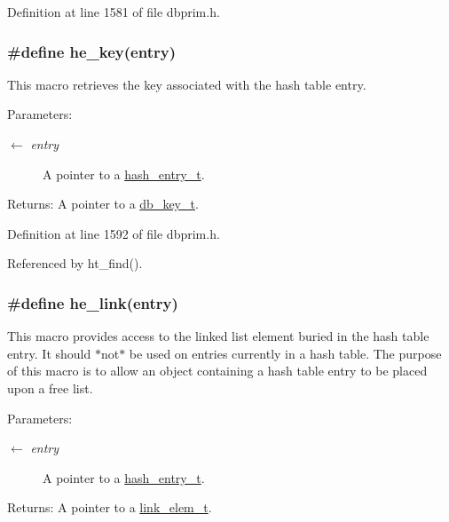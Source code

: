 Definition at line 1581 of file dbprim.h.\hypertarget{group__dbprim__hash_ga44}{
\subsubsection[he\_\-key]{\setlength{\rightskip}{0pt plus 5cm}\#define he\_\-key(entry)}}
\label{group__dbprim__hash_ga44}


This macro retrieves the key associated with the hash table entry.

\begin{Desc}
\item[Parameters:]
\begin{description}
\item[\mbox{$\leftarrow$} {\em entry}]A pointer to a \hyperlink{group__dbprim__hash_ga2}{hash\_\-entry\_\-t}.\end{description}
\end{Desc}
\begin{Desc}
\item[Returns:]A pointer to a \hyperlink{group__dbprim_ga0}{db\_\-key\_\-t}.\end{Desc}


Definition at line 1592 of file dbprim.h.

Referenced by ht\_\-find().\hypertarget{group__dbprim__hash_ga40}{
\subsubsection[he\_\-link]{\setlength{\rightskip}{0pt plus 5cm}\#define he\_\-link(entry)}}
\label{group__dbprim__hash_ga40}


This macro provides access to the linked list element buried in the hash table entry. It should $\ast$not$\ast$ be used on entries currently in a hash table. The purpose of this macro is to allow an object containing a hash table entry to be placed upon a free list.

\begin{Desc}
\item[Parameters:]
\begin{description}
\item[\mbox{$\leftarrow$} {\em entry}]A pointer to a \hyperlink{group__dbprim__hash_ga2}{hash\_\-entry\_\-t}.\end{description}
\end{Desc}
\begin{Desc}
\item[Returns:]A pointer to a \hyperlink{group__dbprim__link_ga1}{link\_\-elem\_\-t}.\end{Desc}


